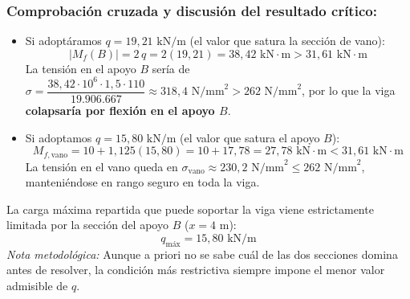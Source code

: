 \subsubsection*{Comprobación cruzada y discusión del resultado crítico:}
\begin{itemize}
    \item Si adoptáramos $q = 19{,}21\text{ kN/m}$ (el valor que satura la sección de vano):
          \[
              |M_f(B)| = 2\,q = 2(19{,}21) = 38{,}42\text{ kN}\cdot\text{m} > 31{,}61\text{ kN}\cdot\text{m}
          \]
          La tensión en el apoyo $B$ sería de $\sigma = \dfrac{38{,}42 \cdot 10^6 \cdot 1{,}5 \cdot 110}{19.906.667} \approx 318{,}4\text{ N/mm}^2 > 262\text{ N/mm}^2$, por lo que la viga \textbf{colapsaría por flexión en el apoyo $B$}.
    \item Si adoptamos $q = 15{,}80\text{ kN/m}$ (el valor que satura el apoyo $B$):
          \[
              M_{f,\text{vano}} = 10 + 1{,}125(15{,}80) = 10 + 17{,}78 = 27{,}78\text{ kN}\cdot\text{m} < 31{,}61\text{ kN}\cdot\text{m}
          \]
          La tensión en el vano queda en $\sigma_{\text{vano}} \approx 230{,}2\text{ N/mm}^2 \le 262\text{ N/mm}^2$, manteniéndose en rango seguro en toda la viga.
\end{itemize}

\begin{tcolorbox}[colback=green!10!white,colframe=green!60!black,title=\textbf{Conclusión y Carga Máxima Admisible}]
    La carga máxima repartida que puede soportar la viga viene estrictamente limitada por la sección del apoyo $B$ ($x = 4\text{ m}$):
    \begin{equation}
        \boxed{q_{\text{máx}} = 15{,}80\text{ kN/m}}
    \end{equation}
    \textit{Nota metodológica:} Aunque a priori no se sabe cuál de las dos secciones domina antes de resolver, la condición más restrictiva siempre impone el menor valor admisible de $q$.
\end{tcolorbox}

